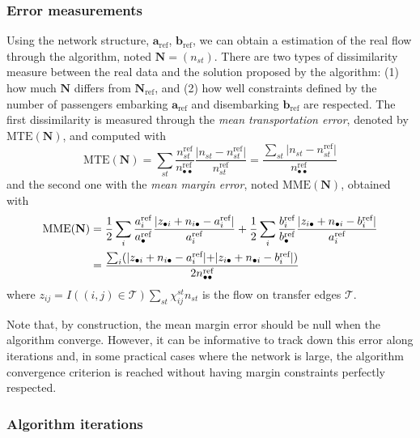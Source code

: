 \documentclass{bmcart}
\begin{document}
\subsubsection{Error measurements}
\label{error_measures}
Using the network structure, $\mathbf{a}_\text{ref}$, $\mathbf{b}_\text{ref}$, we can obtain a estimation of the real flow through the algorithm, noted $\mathbf{N} = (n_{st})$. There are two types of dissimilarity measure between the real data and the solution proposed by the algorithm: (1) how much $\mathbf{N}$ differs from $\mathbf{N}_\text{ref}$, and (2) how well constraints defined by the number of passengers embarking $\mathbf{a}_\text{ref}$ and disembarking $\mathbf{b}_\text{ref}$ are respected. The first dissimilarity is measured through the \emph{mean transportation error}, denoted by $\text{MTE}(\mathbf{N})$, and computed with
\begin{equation}
	\text{MTE}(\mathbf{N}) = \sum_{st} \frac{n^\text{ref}_{st}}{n^\text{ref}_{\bullet \bullet}} \frac{\lvert n_{st} - n^\text{ref}_{st}\lvert}{n^\text{ref}_{st}} = \frac{\sum_{st} \lvert n_{st} - n^\text{ref}_{st}\lvert}{n^\text{ref}_{\bullet \bullet}} 
	\label{MTE}
\end{equation} 
and the second one with the \emph{mean margin error}, noted $\text{MME}(\mathbf{N})$, obtained with
\begin{align}
	\text{MME}(\mathbf{N}) &= \frac{1}{2} \sum_{i} \frac{a^\text{ref}_i}{a^\text{ref}_\bullet} \frac{\lvert z_{\bullet i} + n_{i \bullet} - a^\text{ref}_i \lvert}{a^\text{ref}_i} + \frac{1}{2} \sum_{i} \frac{b^\text{ref}_i}{b^\text{ref}_\bullet} \frac{\lvert z_{i \bullet} + n_{\bullet i} - b^\text{ref}_i \lvert}{a^\text{ref}_i} \notag \\
	&= \frac{\sum_i (\lvert z_{\bullet i} + n_{i \bullet} - a^\text{ref}_i \lvert + \lvert z_{i \bullet} + n_{\bullet i} - b^\text{ref}_i \lvert)}{2n^\text{ref}_{\bullet \bullet}}
	\label{MME}
\end{align} 
where $z_{ij} = I((i,j) \in \mathcal{T})\sum_{st} \chi_{ij}^{st} n_{st}$ is the flow on transfer edges $\mathcal{T}$. 

Note that, by construction, the mean margin error should be null when the algorithm converge. However, it can be informative to track down this error along iterations and, in some practical cases where the network is large, the algorithm convergence criterion is reached without having margin constraints perfectly respected.


\subsubsection{Algorithm iterations}
\label{example_construction}
\end{document}

